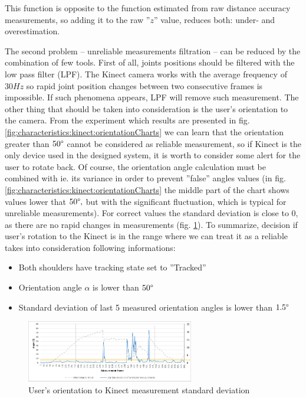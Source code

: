 \documentclass{llncs}
\begin{document}
This function is opposite to the function estimated from raw distance accuracy measurements, so adding it to the raw ''$z$'' value, reduces both: under- and overestimation.

The second problem -- unreliable measurements filtration -- can be reduced by the combination of few tools. First of all, joints positions should be filtered with the low pass filter (LPF). The Kinect camera works with the average frequency of $30Hz$ so rapid joint position changes between two consecutive frames is impossible. If such phenomena appears, LPF will remove such measurement. The other thing that should be taken into consideration is the user's orientation to the camera. From the experiment which results are presented in fig. \ref{fig:characteristics:kinect:orientationCharts} we can learn that the orientation greater than $50\degree$ cannot be considered as reliable measurement, so if Kinect is the only device used in the designed system, it is worth to consider some alert for the user to rotate back. Of course, the orientation angle calculation must be combined with ie. its variance in order to prevent ''false'' angles values (in fig. \ref{fig:characteristics:kinect:orientationCharts} the middle part of the chart shows values lower that $50\degree,$ but with the significant fluctuation, which is typical for unreliable measurements). For correct values the standard deviation is close to 0, as there are no rapid changes in measurements (fig. \ref{fig:characteristics:imu:kinectRotationVariance}).
To summarize, decision if user's rotation to the Kinect is in the range where we can treat it as a reliable takes into consideration following informations:
\begin{itemize}
	\item Both shoulders have tracking state set to ''Tracked''
	\item Orientation angle $\alpha$ is lower than $50\degree$
	\item Standard deviation of last 5 measured orientation angles is lower than $1.5\degree$
\end{itemize}

\begin{figure}[h!]
	\centering 
	\includegraphics[width=0.65\textwidth]{Images/kinectRotationVariance}
	\caption{User's orientation to Kinect measurement standard deviation}
	\label{fig:characteristics:imu:kinectRotationVariance}
\end{figure}
\end{document}
